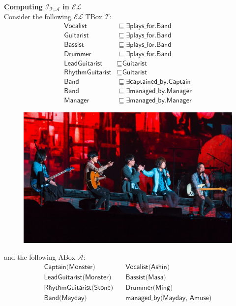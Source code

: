 \documentclass[12pt,a4paper]{article}
\newenvironment{problem}[2][{\color{red}Question}]{\begin{trivlist}
\item[\hskip \labelsep {\bfseries #1}\hskip \labelsep {\bfseries #2.}]}{\end{trivlist}}
\begin{document}
\begin{problem}{{\color{red}2}}
\textbf{Computing $\mathcal{I}_{\mathcal{T},\mathcal{A}}$ in $\mathcal{EL}$}\\
Consider the following $\mathcal{EL}$ TBox $\mathcal{T}$:
\begin{align*}
    \textsf{Vocalist} & \sqsubseteq \exists\textsf{plays\_for.Band}\\
    \textsf{Guitarist} & \sqsubseteq \exists\textsf{plays\_for.Band}\\
    \textsf{Bassist} & \sqsubseteq \exists\textsf{plays\_for.Band}\\
    \textsf{Drummer} & \sqsubseteq \exists\textsf{plays\_for.Band}\\
    \textsf{LeadGuitarist} & \sqsubseteq\textsf{Guitarist}\\
    \textsf{RhythmGuitarist} & \sqsubseteq\textsf{Guitarist}\\
    \textsf{Band} & \sqsubseteq\exists\textsf{captained\_by.Captain}\\
    \textsf{Band} & \sqsubseteq\exists\textsf{managed\_by.Manager}\\
    \textsf{Manager} & \sqsubseteq \exists\textsf{managed\_by.Manager}
\end{align*}
\begin{figure}[ht]
    \centering
    \includegraphics[width=0.6\columnwidth]{mayday.jpg}
     \label{pic2}
\end{figure}
and the following ABox $\mathcal{A}$:
\begin{align*}
    \textsf{Captain(Monster)}\quad &\textsf{Vocalist(Ashin)}\\
    \textsf{LeadGuitarist(Monster)}\quad & \textsf{Bassist(Masa)}\\
    \textsf{RhythmGuitarist(Stone)}\quad & \textsf{Drummer(Ming)}\\
    \textsf{Band(Mayday)}\quad & \textsf{managed\_by(Mayday, Amuse)}
\end{align*}~\\~\\~\\~\\

\end{problem}
\end{document}

